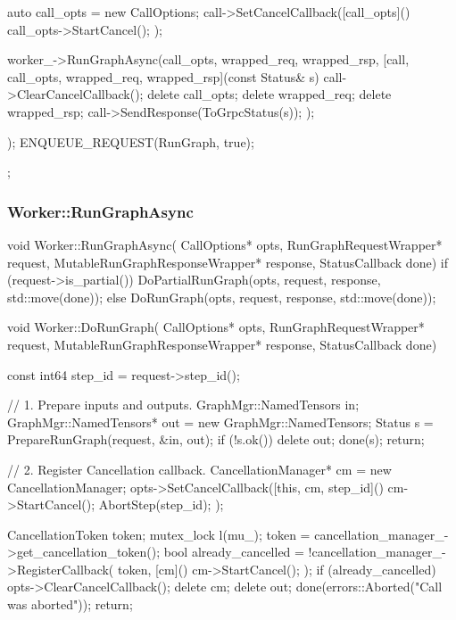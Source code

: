 \begin{content}
\begin{leftbar}
\begin{c++}
{{{      auto call_opts = new CallOptions;
      call->SetCancelCallback([call_opts]() { 
          call_opts->StartCancel(); 
      });

      worker_->RunGraphAsync(call_opts, wrapped_req, wrapped_rsp, 
        [call, call_opts, wrapped_req, wrapped_rsp](const Status& s) {
            call->ClearCancelCallback();
            delete call_opts;
            delete wrapped_req;
            delete wrapped_rsp;
            call->SendResponse(ToGrpcStatus(s));
        });
    });
    ENQUEUE_REQUEST(RunGraph, true);
  }
};
\end{c++}
\end{leftbar}

\subsubsection{Worker::RunGraphAsync}

\begin{leftbar}
\begin{c++}
void Worker::RunGraphAsync(
    CallOptions* opts, 
    RunGraphRequestWrapper* request,
    MutableRunGraphResponseWrapper* response,
    StatusCallback done) {
  if (request->is_partial()) {
    DoPartialRunGraph(opts, request, response, std::move(done));
  } else {
    DoRunGraph(opts, request, response, std::move(done));
  }
}
\end{c++}
\end{leftbar}

\begin{leftbar}
\begin{c++}
void Worker::DoRunGraph(
    CallOptions* opts, 
    RunGraphRequestWrapper* request,
    MutableRunGraphResponseWrapper* response,
    StatusCallback done) {
  const int64 step_id = request->step_id();

  // 1. Prepare inputs and outputs.
  GraphMgr::NamedTensors in;
  GraphMgr::NamedTensors* out = new GraphMgr::NamedTensors;
  Status s = PrepareRunGraph(request, &in, out);
  if (!s.ok()) {
    delete out;
    done(s);
    return;
  }
  
  // 2. Register Cancellation callback.
  CancellationManager* cm = new CancellationManager;
  opts->SetCancelCallback([this, cm, step_id]() {
    cm->StartCancel();
    AbortStep(step_id);
  });

  CancellationToken token;
  {
    mutex_lock l(mu_);
    token = cancellation_manager_->get_cancellation_token();
    bool already_cancelled = !cancellation_manager_->RegisterCallback(
        token, [cm]() { cm->StartCancel(); });
    if (already_cancelled) {
      opts->ClearCancelCallback();
      delete cm;
      delete out;
      done(errors::Aborted("Call was aborted"));
      return;
    }
  }

}
\end{c++}
\end{leftbar}
\end{content}
